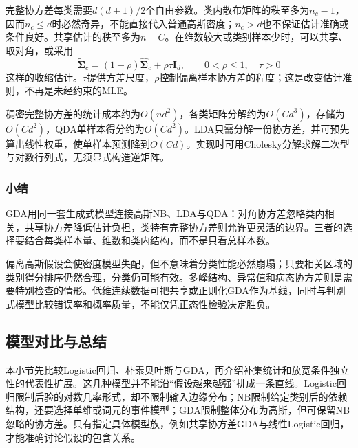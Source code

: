 完整协方差每类需要$d(d+1)/2$个自由参数。类内散布矩阵的秩至多为$n_c-1$，因而$n_c\leq d$时必然奇异，不能直接代入普通高斯密度；$n_c>d$也不保证估计准确或条件良好。共享估计的秩至多为$n-C$。在维数较大或类别样本少时，可以共享、取对角，或采用
\[
  \tilde{\bm{\Sigma}}_c
  =(1-\rho)\hat{\bm{\Sigma}}_c+\rho\tau\bm{I}_d,
  \qquad 0<\rho\leq1,\quad\tau>0
\]
这样的收缩估计。$\tau$提供方差尺度，$\rho$控制偏离样本协方差的程度；这是改变估计准则，不再是未经约束的MLE。

稠密完整协方差的统计成本约为$O(nd^2)$，各类矩阵分解约为$O(Cd^3)$，存储为$O(Cd^2)$，QDA单样本得分约为$O(Cd^2)$。LDA只需分解一份协方差，并可预先算出线性权重，使单样本预测降到$O(Cd)$。实现时可用Cholesky分解求解二次型与对数行列式，无须显式构造逆矩阵。

\subsubsection{小结}
\label{sec:classification-gda-summary}

GDA用同一套生成式模型连接高斯NB、LDA与QDA：对角协方差忽略类内相关，共享协方差降低估计负担，类特有完整协方差则允许更灵活的边界。三者的选择要结合每类样本量、维数和类内结构，而不是只看总样本数。

偏离高斯假设会使密度模型失配，但不意味着分类性能必然崩塌；只要相关区域的类别得分排序仍然合理，分类仍可能有效。多峰结构、异常值和病态协方差则是需要特别检查的情形。低维连续数据可把共享或正则化GDA作为基线，同时与判别式模型比较错误率和概率质量，不能仅凭正态性检验决定胜负。

\subsection{模型对比与总结}
\label{sec:classification-probability-comparison}

本小节先比较Logistic回归、朴素贝叶斯与GDA，再介绍补集统计和放宽条件独立性的代表性扩展。这几种模型并不能沿“假设越来越强”排成一条直线。Logistic回归限制后验的对数几率形式，却不限制输入边缘分布；NB限制给定类别后的依赖结构，还要选择单维或词元的事件模型；GDA限制整体分布为高斯，但可保留NB忽略的协方差。只有指定具体模型族，例如共享协方差GDA与线性Logistic回归，才能准确讨论假设的包含关系。

